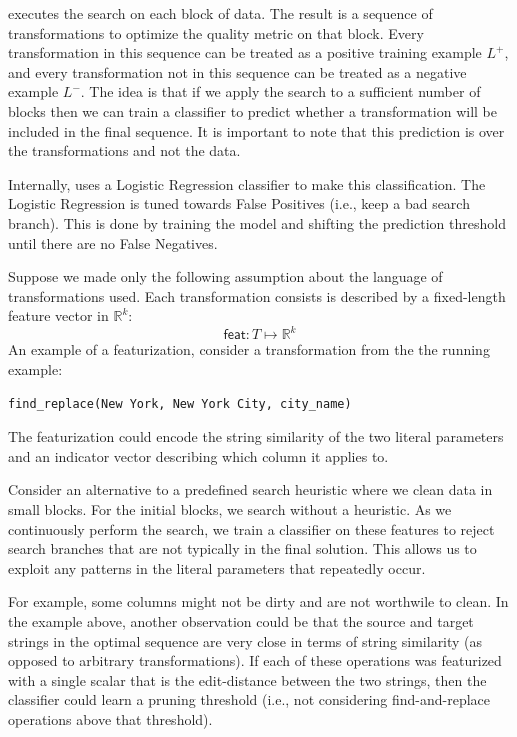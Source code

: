 
\sys executes the search on each block of data.
The result is a sequence of transformations to optimize the quality metric on that block.
Every transformation in this sequence can be treated as a positive training example $L^+$, and every transformation not in this sequence can be treated as a negative example $L^-$.
The idea is that if we apply the search to a sufficient number of blocks then we can train a classifier to predict whether a transformation will be included in the final sequence.
It is important to note that this prediction is over the transformations and not the data. 

Internally, \sys uses a Logistic Regression classifier to make this classification. The Logistic Regression is tuned towards False Positives (i.e., keep a bad search branch). This is done by training the model and shifting the prediction threshold until there are no False Negatives. 


Suppose we made only the following assumption about the language of transformations used.
Each transformation consists is described by a fixed-length feature vector in $\mathbb{R}^k$:
\[
\textsf{feat}: T \mapsto \mathbb{R}^k 
\]
An example of a featurization, consider a transformation from the the running example:
\begin{lstlisting}
find_replace(New York, New York City, city_name)
\end{lstlisting}
The featurization could encode the string similarity of the two literal parameters and an indicator vector describing which column it applies to.

Consider an alternative to a predefined search heuristic where we clean data in small blocks.
For the initial blocks, we search without a heuristic.
As we continuously perform the search, we train a classifier on these features to reject search branches that are not typically in the final solution.
This allows us to exploit any patterns in the literal parameters that repeatedly occur.

For example, some columns might not be dirty and are not worthwile to clean.
In the example above, another observation could be that the source and target strings in the optimal sequence are very close in terms of string similarity (as opposed to arbitrary transformations).
If each of these operations was featurized with a single scalar that is the edit-distance between the two strings, then the classifier could learn a pruning threshold (i.e., not considering find-and-replace operations above that threshold).



